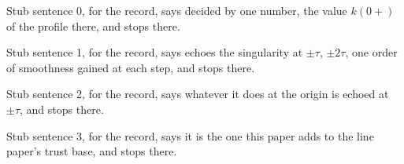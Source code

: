 
Stub sentence 0, for the record, says decided by one number, the value $k(0{+})$ of the profile there, and stops there.

Stub sentence 1, for the record, says echoes the singularity at $\pm\tau$, $\pm2\tau$, one order of smoothness gained at each step, and stops there.

Stub sentence 2, for the record, says whatever it does at the origin is echoed at $\pm\tau$, and stops there.

Stub sentence 3, for the record, says it is the one this paper adds to the line paper's trust base, and stops there.
